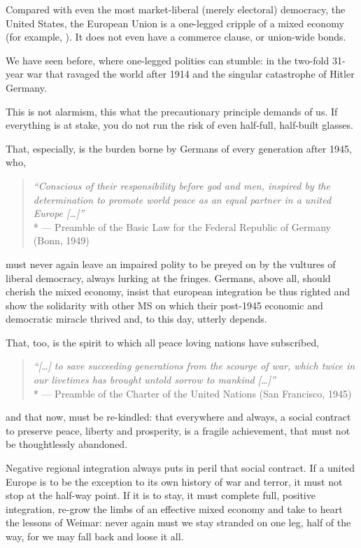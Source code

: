 Compared with even the most market-liberal (merely electoral) democracy, the United States, the European Union is a one-legged cripple of a mixed economy (for example, \citealt{Bordo2011}).
It does not even have a commerce clause, or union-wide bonds.

We have seen before, where one-legged polities can stumble:
in the two-fold 31-year war that ravaged the world after 1914 and the singular catastrophe of Hitler Germany.

This is not alarmism, this what the precautionary principle demands of us.
If everything is at stake, you do not run the risk of even half-full, half-built glasses.

That, especially, is the burden borne by Germans of every generation after 1945, who,
\begin{quote}
	\emph{``Conscious of their responsibility before god and men, inspired by the determination to promote world peace as an equal partner in a united Europe [\ldots]''}
	\\*
	--- Preamble of the Basic Law for the Federal Republic of Germany (Bonn, 1949)
\end{quote}
must never again leave an impaired polity to be preyed on by the vultures of liberal democracy, always lurking at the fringes.
Germans, above all, should cherish the mixed economy, insist that european integration be thus righted and show the solidarity with other \gls{MS} on which their post-1945 economic and democratic miracle thrived and, to this day, utterly depends.

That, too, is the spirit to which all peace loving nations have subscribed,
\begin{quote}
	\emph{``[\ldots] to save succeeding generations from the scourge of war, which twice in our livetimes has brought untold sorrow to mankind [\ldots]''}
	\\*
	--- Preamble of the Charter of the United Nations (San Francisco, 1945)
\end{quote}
and that now, must be re-kindled:
that everywhere and always, a social contract to preserve peace, liberty and prosperity, is a fragile achievement, that must not be thoughtlessly abandoned.

Negative regional integration always puts in peril that social contract.
If a united Europe is to be the exception to its own history of war and terror, it must not stop at the half-way point.
If it is to stay, it must complete full, positive integration, re-grow the limbs of an effective mixed economy and take to heart the lessons of Weimar:
never again must we stay stranded on one leg, half of the way, for we may fall back and loose it all.

